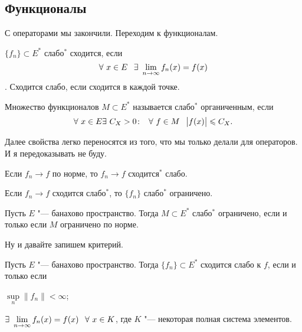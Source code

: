 \subsection{Функционалы}
С операторами мы закончили. Переходим к функционалам.
\begin{Def}
  $\{f_n\}\subset E^*$ слабо${}^*$ сходится, если 
\[
  \forall\ x\in E\pau \exists\ \yo n\infty f_n(x) = f(x)
\].
 Сходится слабо, если сходится в каждой точке.

Множество функционалов $M\subset E^*$ называется слабо${}^*$ органиченным, если
\[
  \forall\ x\in E\exists\ C_X>0\colon \pau \forall\ f\in M\pau \big|f(x)\big|\le C_X.
\]
\end{Def}
Далее свойства легко переносятся из того, что мы только делали для операторов. И я передоказывать не буду.
\begin{Ut}
  Если $f_n\to f$ по норме, то $f_n\to f$ сходится${}^*$ слабо.
\end{Ut}
\begin{Ut}
  Если $f_n\to f$ сходится слабо${}^*$, то $\{f_n\}$ слабо${}^*$ ограничено.
\end{Ut}
\begin{Ut}
  Пусть $E$ "--- банахово пространство. Тогда $M\subset E^*$ слабо${}^*$ ограничено, если и только если $M$ ограничено по норме.
\end{Ut}
Ну и давайте запишем критерий.
\begin{The}
  Пусть $E$ "--- банахово пространство. Тогда $\{f_n\}\subset E^*$ сходится слабо к $f$, если и только если
\begin{roItems}
  \item $\sup\limits_n\|f_n\|<\infty$;
  \item $\exists\ \yo n\infty f_n(x) = f(x)\pau\forall\ x\in K$, где $K$ "--- некоторая полная система элементов.
\end{roItems}
\end{The}

